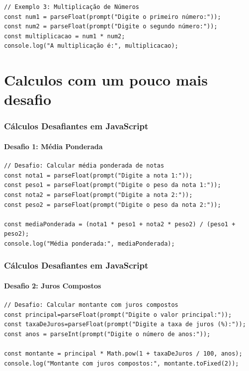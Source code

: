 \documentclass[13pt, xcolor={dvipsnames,svgnames}, portuguese]{beamer}
\begin{document}
\begin{frame}[fragile]

\begin{verbatim}
// Exemplo 3: Multiplicação de Números
const num1 = parseFloat(prompt("Digite o primeiro número:"));
const num2 = parseFloat(prompt("Digite o segundo número:"));
const multiplicacao = num1 * num2;
console.log("A multiplicação é:", multiplicacao);
\end{verbatim}

\end{frame}

\section{Calculos com um pouco mais desafio}

\begin{frame}[fragile]
\frametitle{Cálculos Desafiantes em JavaScript}
\framesubtitle{Desafio 1: Média Ponderada}

\begin{verbatim}
// Desafio: Calcular média ponderada de notas
const nota1 = parseFloat(prompt("Digite a nota 1:"));
const peso1 = parseFloat(prompt("Digite o peso da nota 1:"));
const nota2 = parseFloat(prompt("Digite a nota 2:"));
const peso2 = parseFloat(prompt("Digite o peso da nota 2:"));

const mediaPonderada = (nota1 * peso1 + nota2 * peso2) / (peso1 + peso2);
console.log("Média ponderada:", mediaPonderada);
\end{verbatim}

\end{frame}

\begin{frame}[fragile]
\frametitle{Cálculos Desafiantes em JavaScript}
\framesubtitle{Desafio 2: Juros Compostos}

\begin{verbatim}
// Desafio: Calcular montante com juros compostos
const principal=parseFloat(prompt("Digite o valor principal:"));
const taxaDeJuros=parseFloat(prompt("Digite a taxa de juros (%):"));
const anos = parseInt(prompt("Digite o número de anos:"));

const montante = principal * Math.pow(1 + taxaDeJuros / 100, anos);
console.log("Montante com juros compostos:", montante.toFixed(2));
\end{verbatim}

\end{frame}
\end{document}
